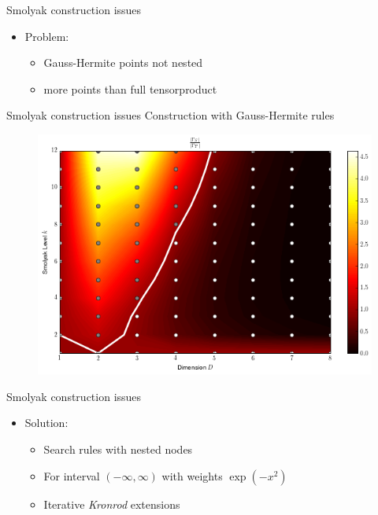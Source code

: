 \documentclass{beamer}
\begin{document}


\begin{frame}{Smolyak construction issues}
  \begin{itemize}
    \item Problem:
    \begin{itemize}
      \item Gauss-Hermite points not nested
      \item more points than full tensorproduct
    \end{itemize}
  \end{itemize}
\end{frame}

\begin{frame}{Smolyak construction issues}
  Construction with Gauss-Hermite rules
  \begin{figure}
    \centering
    \includegraphics[width=0.8\linewidth]{./fig/smolyak_gauss_ratiomap.png}
  \end{figure}
\end{frame}

\begin{frame}{Smolyak construction issues}
  \begin{itemize}
    \item Solution:
    \begin{itemize}
      \item Search rules with nested nodes
      \item For interval $(-\infty, \infty)$ with weights $\exp(-x^2)$
      \item Iterative \emph{Kronrod} extensions
    \end{itemize}
  \end{itemize}
\end{frame}
\end{document}
